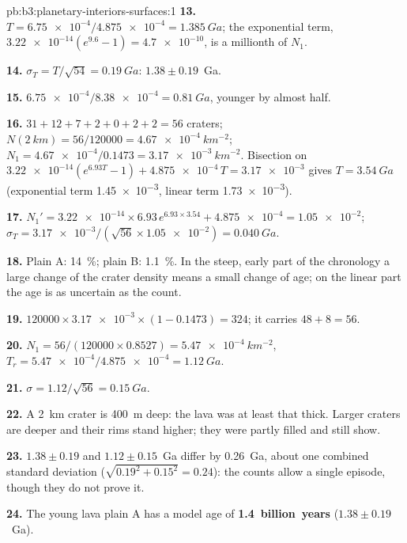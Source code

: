 \begin{solution}{pb:b3:planetary-interiors-surfaces:1}
\textbf{13.} $T = \num{6.75e-4}/\num{4.875e-4} = \qty{1.385}{Ga}$; the
exponential term, $\num{3.22e-14}(e^{9.6} - 1) = \num{4.7e-10}$, is a
millionth of $N_1$.

\textbf{14.} $\sigma_T = T/\sqrt{54} = \qty{0.19}{Ga}$: $1.38 \pm 0.19$~Ga.

\textbf{15.} $\num{6.75e-4}/\num{8.38e-4} = \qty{0.81}{Ga}$, younger by
almost half.

\textbf{16.} $31 + 12 + 7 + 2 + 0 + 2 + 2 = 56$ craters; $N(\qty{2}{km}) =
56/120000 = \qty{4.67e-4}{km^{-2}}$; $N_1 = \num{4.67e-4}/0.1473 =
\qty{3.17e-3}{km^{-2}}$. Bisection on $\num{3.22e-14}(e^{6.93T} - 1) +
\num{4.875e-4}\,T = \num{3.17e-3}$ gives $T = \qty{3.54}{Ga}$ (exponential
term \num{1.45e-3}, linear term \num{1.73e-3}).

\textbf{17.} $N_1' = \num{3.22e-14}\times6.93\,e^{6.93\times3.54} +
\num{4.875e-4} = \num{1.05e-2}$; $\sigma_T = \num{3.17e-3}/(\sqrt{56}\times
\num{1.05e-2}) = \qty{0.040}{Ga}$.

\textbf{18.} Plain A: \qty{14}{\percent}; plain B: \qty{1.1}{\percent}. In
the steep, early part of the chronology a large change of the crater
density means a small change of age; on the linear part the age is as
uncertain as the count.

\textbf{19.} $120000\times\num{3.17e-3}\times(1 - 0.1473) = 324$; it
carries $48 + 8 = 56$.

\textbf{20.} $N_1 = 56/(120000\times0.8527) = \qty{5.47e-4}{km^{-2}}$,
$T_r = \num{5.47e-4}/\num{4.875e-4} = \qty{1.12}{Ga}$.

\textbf{21.} $\sigma = 1.12/\sqrt{56} = \qty{0.15}{Ga}$.

\textbf{22.} A \qty{2}{km} crater is \qty{400}{m} deep: the lava was at
least that thick. Larger craters are deeper and their rims stand higher;
they were partly filled and still show.

\textbf{23.} $1.38 \pm 0.19$ and $1.12 \pm 0.15$~Ga differ by \qty{0.26}{Ga},
about one combined standard deviation ($\sqrt{0.19^2 + 0.15^2} = 0.24$):
the counts allow a single episode, though they do not prove it.

\textbf{24.} The young lava plain A has a model age of
\textbf{1.4~billion~years} ($1.38 \pm 0.19$~Ga).
\end{solution}
